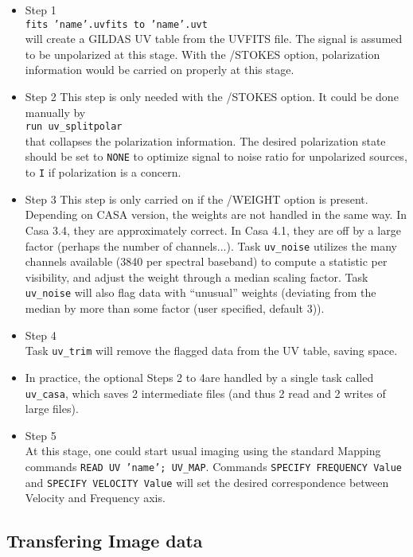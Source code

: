 \begin{itemize}
\item Step 1 \\
\texttt{fits 'name'.uvfits to 'name'.uvt}\\
will create a GILDAS UV table from the UVFITS file. The signal
is assumed to be unpolarized at this stage. With the /STOKES
option, polarization information would be carried on properly at this stage.
\item Step 2 
This step is only needed with the /STOKES option. It could be
done manually by \\
\texttt{run uv\_splitpolar} \\
that collapses the polarization information. The desired 
polarization state should be set to \texttt{NONE} to optimize signal to noise
ratio for unpolarized sources, to \texttt{I} if polarization
is a concern.
\item Step 3
This step is only carried on if the /WEIGHT option is present. 
Depending on CASA version, the weights are not handled in the same way. 
In Casa 3.4, they are approximately correct. In Casa 4.1, they are off 
by a large factor (perhaps the number of channels...).  Task 
\texttt{uv\_noise} utilizes the many channels available (3840 per 
spectral baseband) to compute a statistic per visibility, and adjust 
the weight through a median scaling factor. Task \texttt{uv\_noise} 
will also flag data with ``unusual'' weights (deviating from the median 
by more than some factor (user specified, default 3)).\\ \item Step 4 
\\ Task \texttt{uv\_trim} will remove the flagged data from the UV 
table, saving space.
\item In practice, the optional Steps 2 to 4are handled by a single
task called \texttt{uv\_casa}, which saves 2 intermediate files
(and thus 2 read and 2 writes of large files).
\item Step 5\\
At this stage, one could start usual imaging using the
standard Mapping commands \texttt{READ UV 'name'; UV\_MAP}. 
Commands \texttt{SPECIFY FREQUENCY Value} and \texttt{SPECIFY 
VELOCITY Value} will set the desired correspondence  between
Velocity and Frequency axis.
\end{itemize}



\subsection{Transfering Image data}

